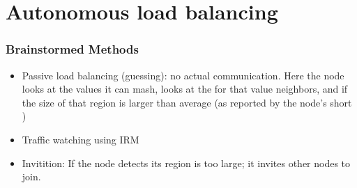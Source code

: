 \begin{itemize}
\end{itemize}



\section{Autonomous load balancing}



\subsubsection{Brainstormed Methods}
\begin{itemize}
	\item Passive load balancing (guessing):  no actual communication.
	Here the node looks at the values it can mash, looks at the for that value neighbors, and if the size of that region is larger than average (as reported by the node's short )
	\item Traffic watching using IRM
	\item Invitition:  If the node detects its region is too large; it invites other nodes to join.
\end{itemize}

